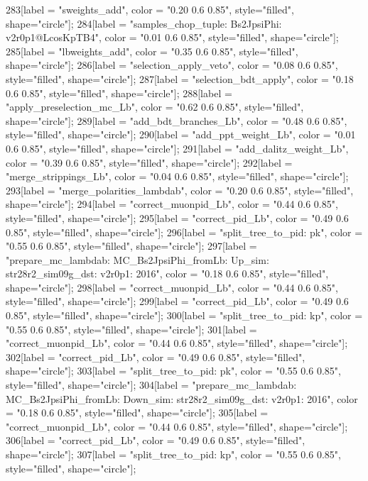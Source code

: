 {	283[label = "sweights_add", color = "0.20 0.6 0.85", style="filled", shape="circle"];
	284[label = "samples_chop_tuple\nmode: Bs2JpsiPhi\nversion: v2r0p1@LcosKpTB4", color = "0.01 0.6 0.85", style="filled", shape="circle"];
	285[label = "lbweights_add", color = "0.35 0.6 0.85", style="filled", shape="circle"];
	286[label = "selection_apply_veto", color = "0.08 0.6 0.85", style="filled", shape="circle"];
	287[label = "selection_bdt_apply", color = "0.18 0.6 0.85", style="filled", shape="circle"];
	288[label = "apply_preselection_mc_Lb", color = "0.62 0.6 0.85", style="filled", shape="circle"];
	289[label = "add_bdt_branches_Lb", color = "0.48 0.6 0.85", style="filled", shape="circle"];
	290[label = "add_ppt_weight_Lb", color = "0.01 0.6 0.85", style="filled", shape="circle"];
	291[label = "add_dalitz_weight_Lb", color = "0.39 0.6 0.85", style="filled", shape="circle"];
	292[label = "merge_strippings_Lb", color = "0.04 0.6 0.85", style="filled", shape="circle"];
	293[label = "merge_polarities_lambdab", color = "0.20 0.6 0.85", style="filled", shape="circle"];
	294[label = "correct_muonpid_Lb", color = "0.44 0.6 0.85", style="filled", shape="circle"];
	295[label = "correct_pid_Lb", color = "0.49 0.6 0.85", style="filled", shape="circle"];
	296[label = "split_tree_to_pid\npkkp: pk", color = "0.55 0.6 0.85", style="filled", shape="circle"];
	297[label = "prepare_mc_lambdab\nmode: MC_Bs2JpsiPhi_fromLb\npolarity: Up\nstrip_sim: str28r2_sim09g_dst\nversion: v2r0p1\nyear: 2016", color = "0.18 0.6 0.85", style="filled", shape="circle"];
	298[label = "correct_muonpid_Lb", color = "0.44 0.6 0.85", style="filled", shape="circle"];
	299[label = "correct_pid_Lb", color = "0.49 0.6 0.85", style="filled", shape="circle"];
	300[label = "split_tree_to_pid\npkkp: kp", color = "0.55 0.6 0.85", style="filled", shape="circle"];
	301[label = "correct_muonpid_Lb", color = "0.44 0.6 0.85", style="filled", shape="circle"];
	302[label = "correct_pid_Lb", color = "0.49 0.6 0.85", style="filled", shape="circle"];
	303[label = "split_tree_to_pid\npkkp: pk", color = "0.55 0.6 0.85", style="filled", shape="circle"];
	304[label = "prepare_mc_lambdab\nmode: MC_Bs2JpsiPhi_fromLb\npolarity: Down\nstrip_sim: str28r2_sim09g_dst\nversion: v2r0p1\nyear: 2016", color = "0.18 0.6 0.85", style="filled", shape="circle"];
	305[label = "correct_muonpid_Lb", color = "0.44 0.6 0.85", style="filled", shape="circle"];
	306[label = "correct_pid_Lb", color = "0.49 0.6 0.85", style="filled", shape="circle"];
	307[label = "split_tree_to_pid\npkkp: kp", color = "0.55 0.6 0.85", style="filled", shape="circle"];
}
